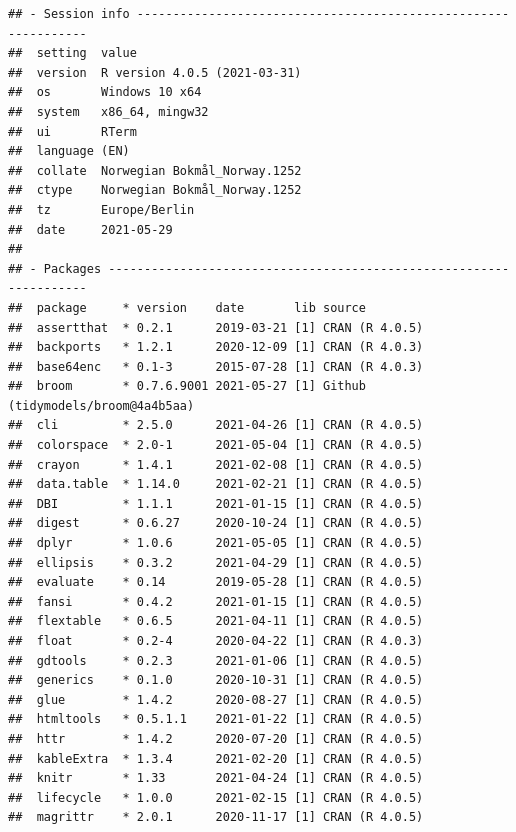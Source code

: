 \documentclass[
  11pt,
]{article}
\begin{document}
\begin{verbatim}
## - Session info ---------------------------------------------------------------
##  setting  value                       
##  version  R version 4.0.5 (2021-03-31)
##  os       Windows 10 x64              
##  system   x86_64, mingw32             
##  ui       RTerm                       
##  language (EN)                        
##  collate  Norwegian Bokmål_Norway.1252
##  ctype    Norwegian Bokmål_Norway.1252
##  tz       Europe/Berlin               
##  date     2021-05-29                  
## 
## - Packages -------------------------------------------------------------------
##  package     * version    date       lib source                           
##  assertthat  * 0.2.1      2019-03-21 [1] CRAN (R 4.0.5)                   
##  backports   * 1.2.1      2020-12-09 [1] CRAN (R 4.0.3)                   
##  base64enc   * 0.1-3      2015-07-28 [1] CRAN (R 4.0.3)                   
##  broom       * 0.7.6.9001 2021-05-27 [1] Github (tidymodels/broom@4a4b5aa)
##  cli         * 2.5.0      2021-04-26 [1] CRAN (R 4.0.5)                   
##  colorspace  * 2.0-1      2021-05-04 [1] CRAN (R 4.0.5)                   
##  crayon      * 1.4.1      2021-02-08 [1] CRAN (R 4.0.5)                   
##  data.table  * 1.14.0     2021-02-21 [1] CRAN (R 4.0.5)                   
##  DBI         * 1.1.1      2021-01-15 [1] CRAN (R 4.0.5)                   
##  digest      * 0.6.27     2020-10-24 [1] CRAN (R 4.0.5)                   
##  dplyr       * 1.0.6      2021-05-05 [1] CRAN (R 4.0.5)                   
##  ellipsis    * 0.3.2      2021-04-29 [1] CRAN (R 4.0.5)                   
##  evaluate    * 0.14       2019-05-28 [1] CRAN (R 4.0.5)                   
##  fansi       * 0.4.2      2021-01-15 [1] CRAN (R 4.0.5)                   
##  flextable   * 0.6.5      2021-04-11 [1] CRAN (R 4.0.5)                   
##  float       * 0.2-4      2020-04-22 [1] CRAN (R 4.0.3)                   
##  gdtools     * 0.2.3      2021-01-06 [1] CRAN (R 4.0.5)                   
##  generics    * 0.1.0      2020-10-31 [1] CRAN (R 4.0.5)                   
##  glue        * 1.4.2      2020-08-27 [1] CRAN (R 4.0.5)                   
##  htmltools   * 0.5.1.1    2021-01-22 [1] CRAN (R 4.0.5)                   
##  httr        * 1.4.2      2020-07-20 [1] CRAN (R 4.0.5)                   
##  kableExtra  * 1.3.4      2021-02-20 [1] CRAN (R 4.0.5)                   
##  knitr       * 1.33       2021-04-24 [1] CRAN (R 4.0.5)                   
##  lifecycle   * 1.0.0      2021-02-15 [1] CRAN (R 4.0.5)                   
##  magrittr    * 2.0.1      2020-11-17 [1] CRAN (R 4.0.5)                   

\end{verbatim}
\end{document}
